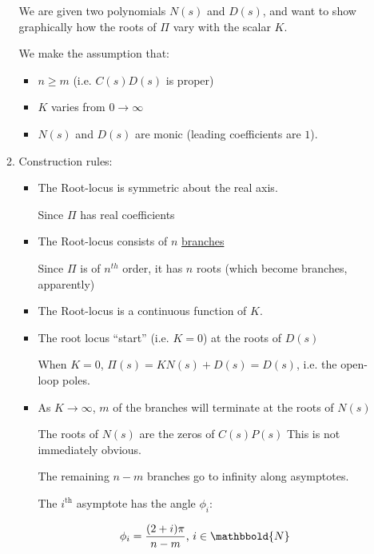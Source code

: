\begin{enumerate}
\begin{enumerate}
                We are given two polynomials $N(s)$ and $D(s)$, and want to show graphically how the roots of $\Pi$ vary with the scalar $K$.

                We make the assumption that:
                \begin{itemize}
                    \item $n \ge m$ (i.e. $C(s)D(s)$ is proper)
                    \item $K$ varies from $ 0 \to \infty$
                    \item $N(s)$ and $D(s)$ are monic (leading coefficients are $1$).
                \end{itemize}
            \item Construction rules:
                \begin{itemize}
                    \item The Root-locus is symmetric about the real axis.

                        Since $\Pi$ has real coefficients

                    \item The Root-locus consists of $n$ \uline{branches}

                        Since $\Pi$ is of $n^{th}$ order, it has $n$ roots (which become branches, apparently)

                    \item The Root-locus is a continuous function of $K$.

                    \item The root locus ``start'' (i.e. $K = 0$) at the roots of $D(s)$

                        When $K = 0$, $\Pi(s) = KN(s) + D(s) = D(s)$, i.e. the open-loop poles.

                    \item As $K \to \infty$, $m$ of the branches will terminate at the roots of $N(s)$

                        The roots of $N(s)$ are the zeros of $C(s)P(s)$
                        This is not immediately obvious.

                        The remaining $n-m$ branches go to infinity along asymptotes.

                        The $i^{\text{th}}$ asymptote has the angle $\phi _i$:

                        \begin{align*}
                            \phi_i &= \frac{(2+i)\pi}{n-m} \text{, } i\in \mathbbold{N}
                        \end{align*}


\end{itemize}
\end{enumerate}
\end{enumerate}
